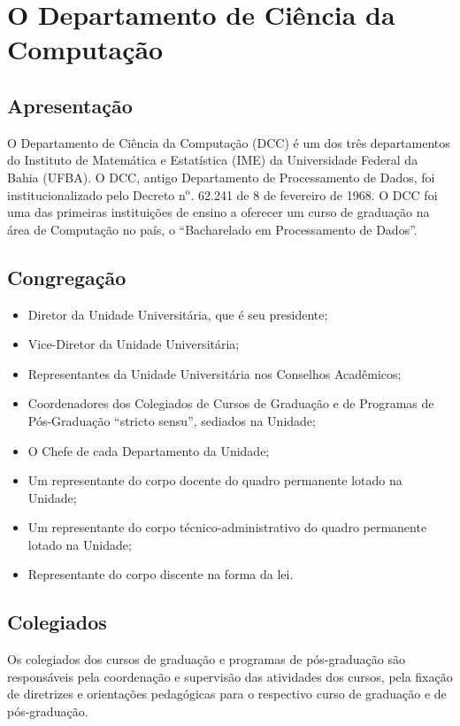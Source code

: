 \chapter{O Departamento de Ciência da Computação}

\section{Apresentação}

O Departamento de Ciência da Computação (DCC) é um dos três departamentos do Instituto de Matemática e Estatística (IME) da Universidade Federal da Bahia (UFBA). O DCC, antigo Departamento de Processamento de Dados, foi institucionalizado pelo Decreto n$^{\mbox{o}}$. 62.241 de 8 de fevereiro de 1968. O DCC foi uma das primeiras instituições de ensino a oferecer um curso de graduação na área de Computação no país, o ``Bacharelado em Processamento de Dados''.

\section{Congregação}
\begin{itemize}
    \item Diretor da Unidade Universitária, que é seu presidente;
    \item Vice-Diretor da Unidade Universitária;
    \item Representantes da Unidade Universitária nos Conselhos Acadêmicos;
    \item Coordenadores dos Colegiados de Cursos de Graduação e de Programas de Pós-Graduação “stricto sensu”, sediados na Unidade;
    \item O Chefe de cada Departamento da Unidade;
    \item Um representante do corpo docente do quadro permanente lotado na Unidade;
    \item Um representante do corpo técnico-administrativo do quadro permanente lotado na Unidade;
    \item Representante do corpo discente na forma da lei.
\end{itemize}

\section{Colegiados}

Os colegiados dos cursos de graduação e programas de pós-graduação são responsáveis pela coordenação e supervisão das atividades dos cursos, pela fixação de diretrizes e orientações pedagógicas para o respectivo curso de graduação e de pós-graduação.

